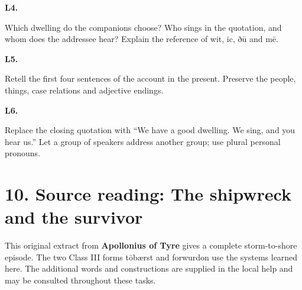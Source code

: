 \par\begin{minipage}{\linewidth}\raggedright
\textbf{L4.}

Which dwelling do the companions choose? Who sings in the quotation, and whom does the addressee hear? Explain the reference of wit, ic, ðū and mē.

\end{minipage}\par\addvspace{4pt}

\par\begin{minipage}{\linewidth}\raggedright
\textbf{L5.}

Retell the first four sentences of the account in the present. Preserve the people, things, case relations and adjective endings.

\end{minipage}\par\addvspace{4pt}

\par\begin{minipage}{\linewidth}\raggedright
\textbf{L6.}

Replace the closing quotation with “We have a good dwelling. We sing, and you hear us.” Let a group of speakers address another group; use plural personal pronouns.

\end{minipage}\par\addvspace{4pt}

\section*{10. Source reading: The shipwreck and the survivor}

This original extract from \textbf{Apollonius of Tyre} gives a complete storm-to-shore episode. The two Class III forms tōbærst and forwurdon use the systems learned here. The additional words and constructions are supplied in the local help and may be consulted throughout these tasks.

